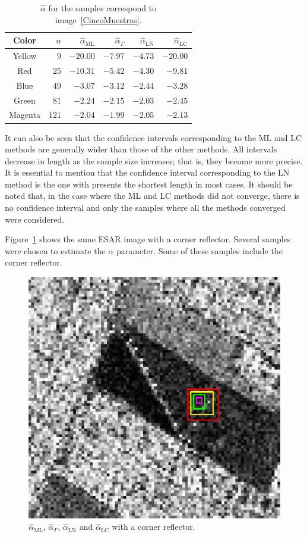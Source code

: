 \documentclass[twocolumn]{svjour3}
\begin{document}
\begin{table}[hbt]
	\centering
	\caption{\label{TablaCincoMuestras} $\widehat{\alpha}$ for the samples correspond to image~\ref{CincoMuestras}.}
	\begin{tabular}{c*5{r}}
		\toprule
		Color       &  $n$    &  $\widehat{\alpha}_{\text{{ML}}}$    &  $\widehat{\alpha}_{\Gamma}$  &  $\widehat{\alpha}_{\text{{LN}}}$ &  $\widehat{\alpha}_{\text{{LC}}}$\\
		\midrule
		Yellow      & $9$     & $-20.00$      & $-7.97$ & $-4.73$ & $-20.00$\\
		Red         & $25$    & $-10.31$  & $-5.42$ & $-4.30$ & $-9.81$\\
		Blue        & $49$    & $-3.07$   & $-3.12$ & $-2.44$ & $-3.28$\\
		Green       & $81$    & $-2.24$   & $-2.15$ & $-2.03$ & $-2.45$\\
		Magenta     & $121$   & $-2.04$   & $-1.99$ & $-2.05$ & $-2.13$\\
		\bottomrule
	\end{tabular}
\end{table}


It can also be seen that the confidence intervals corresponding to the ML and LC methods are generally wider than those of the other methods. All intervals decrease in length as the sample size increases; that is, they become more precise. It is essential to mention that the confidence interval corresponding to the LN method is the one with presents the shortest length in most cases. It should be noted that, in the case where the ML and LC methods did not converge, there is no confidence interval and only the samples where all the methods converged were considered.

Figure~\ref{CornerReflector} shows the same ESAR image with a corner reflector. Several samples were chosen to estimate the $\alpha$ parameter. Some of these samples include the corner reflector.

\begin{figure}[htb]
	\centering
	\includegraphics[width=0.7\linewidth]{../../../Figures/PaperTesis/CornerJulia_Roja.eps}
	\caption{\label{CornerReflector}\small $\widehat{\alpha}_{\text{{ML}}}$, $\widehat{\alpha}_{\Gamma}$, $\widehat{\alpha}_{\text{{LN}}}$ and $\widehat{\alpha}_{\text{{LC}}}$ with a corner reflector.}
\end{figure}
\end{document}
